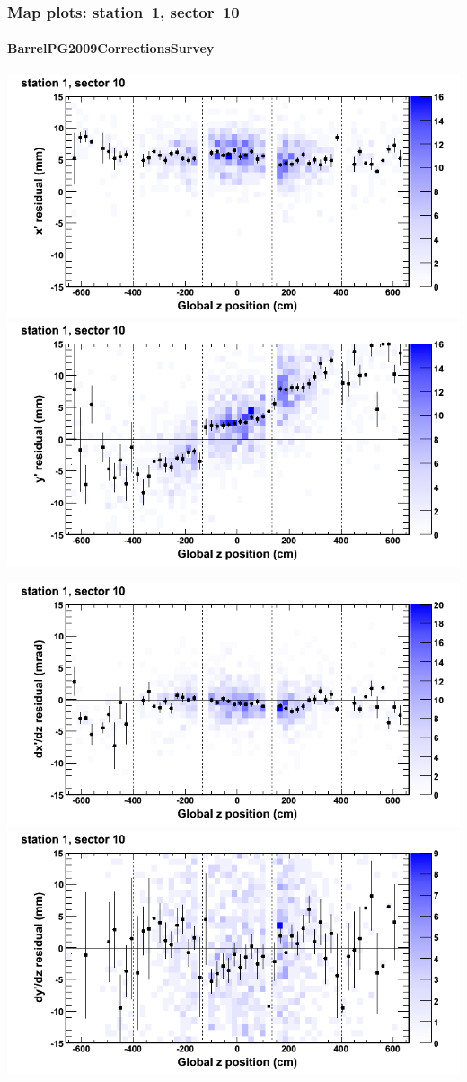 \documentclass[compress]{beamer}
\begin{document}
\begin{frame}
\frametitle{Map plots: station~1, sector~10}
\framesubtitle{BarrelPG2009CorrectionsSurvey}
\includegraphics[width=0.5\linewidth]{mapplots_01/DTvsz_st1sec10_x.png}
\includegraphics[width=0.5\linewidth]{mapplots_01/DTvsz_st1sec10_y.png}

\includegraphics[width=0.5\linewidth]{mapplots_01/DTvsz_st1sec10_dxdz.png}
\includegraphics[width=0.5\linewidth]{mapplots_01/DTvsz_st1sec10_dydz.png}
\end{frame}
\end{document}
